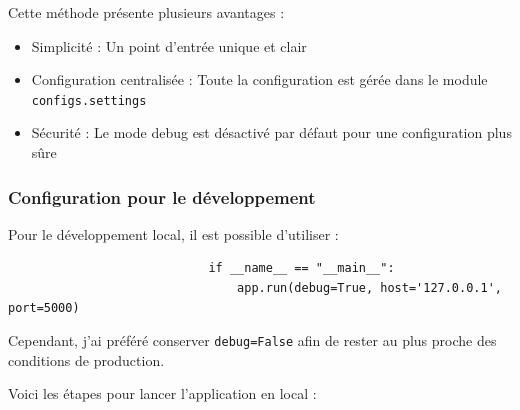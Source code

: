 \documentclass[a4paper,11pt]{article}
\begin{document}
                    \noindent Cette méthode présente plusieurs avantages :
                    \begin{itemize}
                        \item Simplicité : Un point d'entrée unique et clair
                        \item Configuration centralisée : Toute la configuration est gérée dans le module \texttt{configs.settings}
                        \item Sécurité : Le mode debug est désactivé par défaut pour une configuration plus sûre
                    \end{itemize}

                \subsubsection{Configuration pour le développement}
                    \noindent Pour le développement local, il est possible d'utiliser :

                    \begin{tcolorbox}[colback=lightgray!6, colframe=black, left=-50mm, right=5mm, top=2mm, bottom=0mm, boxrule=0.1mm]
                        \begin{verbatim}
                            if __name__ == "__main__":
                                app.run(debug=True, host='127.0.0.1', port=5000)
                        \end{verbatim}
                    \end{tcolorbox}

                    \noindent Cependant, j'ai préféré conserver \texttt{debug=False} afin de rester au plus proche des conditions de production.

                    \noindent Voici les étapes pour lancer l'application en local :
\end{document}
